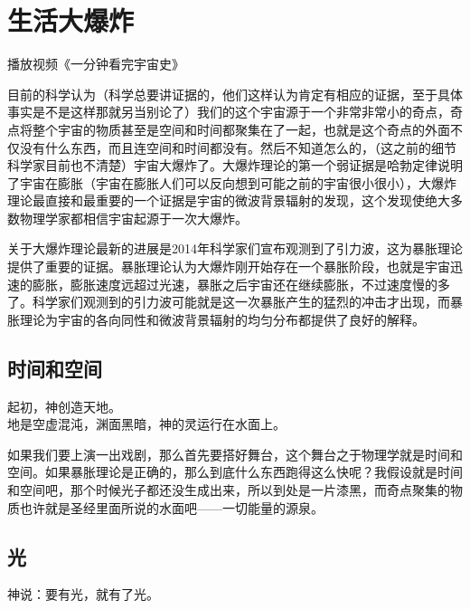 \documentclass[12pt]{exam}%
\begin{document}
\section{生活大爆炸}
播放视频《一分钟看完宇宙史》

目前的科学认为（科学总要讲证据的，他们这样认为肯定有相应的证据，至于具体事实是不是这样那就另当别论了）我们的这个宇宙源于一个非常非常小的奇点，奇点将整个宇宙的物质甚至是空间和时间都聚集在了一起，也就是这个奇点的外面不仅没有什么东西，而且连空间和时间都没有。然后不知道怎么的，（这之前的细节科学家目前也不清楚）宇宙大爆炸了。大爆炸理论的第一个弱证据是哈勃定律说明了宇宙在膨胀（宇宙在膨胀人们可以反向想到可能之前的宇宙很小很小），大爆炸理论最直接和最重要的一个证据是宇宙的微波背景辐射的发现，这个发现使绝大多数物理学家都相信宇宙起源于一次大爆炸。

关于大爆炸理论最新的进展是2014年科学家们宣布观测到了引力波，这为暴胀理论提供了重要的证据。暴胀理论认为大爆炸刚开始存在一个暴胀阶段，也就是宇宙迅速的膨胀，膨胀速度远超过光速，暴胀之后宇宙还在继续膨胀，不过速度慢的多了。科学家们观测到的引力波可能就是这一次暴胀产生的猛烈的冲击才出现，而暴胀理论为宇宙的各向同性和微波背景辐射的均匀分布都提供了良好的解释。

\subsection{时间和空间}
\begin{flushright}
\begin{notecard}[ce7f4fe]{12em}
起初，神创造天地。\\
地是空虚混沌，渊面黑暗，神的灵运行在水面上。 
\end{notecard}
\end{flushright}

如果我们要上演一出戏剧，那么首先要搭好舞台，这个舞台之于物理学就是时间和空间。如果暴胀理论是正确的，那么到底什么东西跑得这么快呢？我假设就是时间和空间吧，那个时候光子都还没生成出来，所以到处是一片漆黑，而奇点聚集的物质也许就是圣经里面所说的水面吧——一切能量的源泉。


\subsection{光}
\begin{flushright}
\begin{notecard}[ce7f4fe]{12em}
神说：要有光，就有了光。 
\end{notecard}
\end{flushright}
\end{document}
